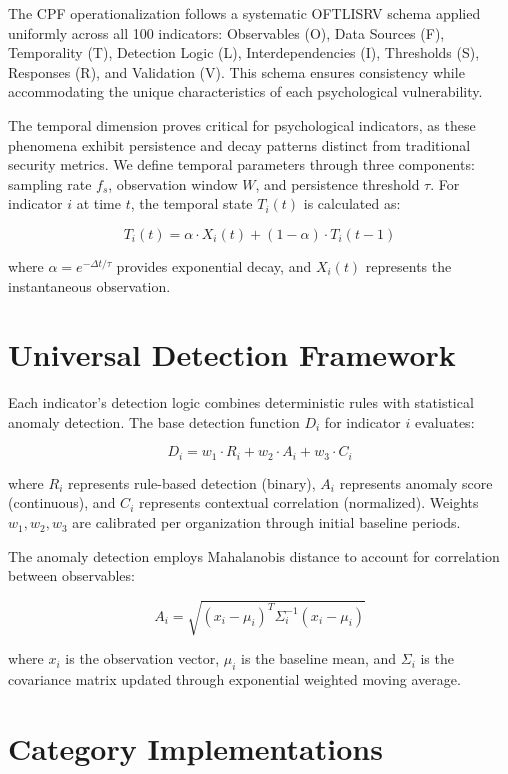 \documentclass[10pt, twocolumn]{article}
\begin{document}
The CPF operationalization follows a systematic OFTLISRV schema applied uniformly across all 100 indicators: Observables (O), Data Sources (F), Temporality (T), Detection Logic (L), Interdependencies (I), Thresholds (S), Responses (R), and Validation (V). This schema ensures consistency while accommodating the unique characteristics of each psychological vulnerability.

The temporal dimension proves critical for psychological indicators, as these phenomena exhibit persistence and decay patterns distinct from traditional security metrics. We define temporal parameters through three components: sampling rate $f_s$, observation window $W$, and persistence threshold $\tau$. For indicator $i$ at time $t$, the temporal state $T_i(t)$ is calculated as:

$$T_i(t) = \alpha \cdot X_i(t) + (1-\alpha) \cdot T_i(t-1)$$

where $\alpha = e^{-\Delta t/\tau}$ provides exponential decay, and $X_i(t)$ represents the instantaneous observation.

\section{Universal Detection Framework}

Each indicator's detection logic combines deterministic rules with statistical anomaly detection. The base detection function $D_i$ for indicator $i$ evaluates:

$$D_i = w_1 \cdot R_i + w_2 \cdot A_i + w_3 \cdot C_i$$

where $R_i$ represents rule-based detection (binary), $A_i$ represents anomaly score (continuous), and $C_i$ represents contextual correlation (normalized). Weights $w_1, w_2, w_3$ are calibrated per organization through initial baseline periods.

The anomaly detection employs Mahalanobis distance to account for correlation between observables:

$$A_i = \sqrt{(x_i - \mu_i)^T \Sigma_i^{-1} (x_i - \mu_i)}$$

where $x_i$ is the observation vector, $\mu_i$ is the baseline mean, and $\Sigma_i$ is the covariance matrix updated through exponential weighted moving average.

\section{Category Implementations}
\end{document}
